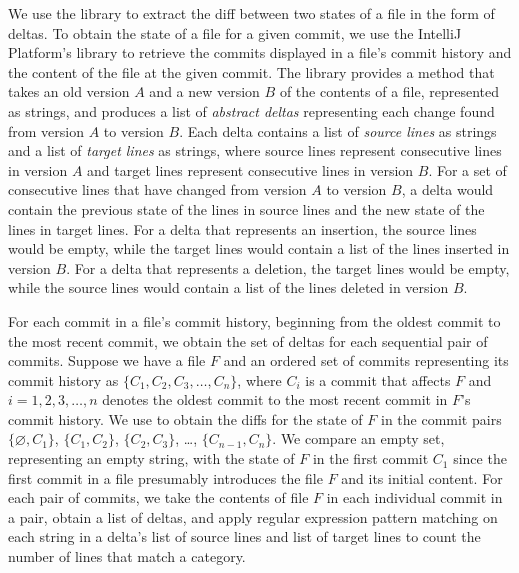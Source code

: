 We use the  \cite{java-diff-utils} library to extract the diff between two states of a file in the form of deltas. 
To obtain the state of a file for a given commit, we use the IntelliJ Platform's  library to retrieve the commits displayed in a file's commit history and the content of the file at the given commit.
The  library provides a method that takes an old version $A$ and a new version $B$ of the contents of a file, represented as strings, and produces a list of \emph{abstract deltas} representing each change found from version $A$ to version $B$. 
Each delta contains a list of \emph{source lines} as strings and a list of \emph{target lines} as strings, where source lines represent consecutive lines in version $A$ and target lines represent consecutive lines in version $B$. 
For a set of consecutive lines that have changed from version $A$ to version $B$, a delta would contain the previous state of the lines in source lines and the new state of the lines in target lines.
For a delta that represents an insertion, the source lines would be empty, while the target lines would contain a list of the lines inserted in version $B$.
For a delta that represents a deletion, the target lines would be empty, while the source lines would contain a list of the lines deleted in version $B$.

For each commit in a file's commit history, beginning from the oldest commit to the most recent commit, 
we obtain the set of deltas for each sequential pair of commits.
Suppose we have a file $F$ and an ordered set of commits representing its commit history as 
$\{C_{1}, C_{2}, C_{3}, \dots, C_{n}\}$, where $C_{i}$ is a commit that affects $F$ and $i = 1, 2, 3, \dots, n$ denotes the oldest commit to the most recent commit in $F$'s commit history.
We use  to obtain the diffs for the state of $F$ in the commit pairs 
$\{\varnothing, C_{1}\}$, $\{C_{1}, C_{2}\}$, $\{C_{2}, C_{3}\}$, \dots, $\{C_{n-1}, C_{n}\}$.
We compare an empty set, representing an empty string, with the state of $F$ in the first commit $C_{1}$ since the first commit in a file presumably introduces the file $F$ and its initial content.
For each pair of commits, we take the contents of file $F$ in each individual commit in a pair, obtain a list of deltas, and apply regular expression pattern matching on each string in a delta's list of source lines and list of target lines to count the number of lines that match a category.

